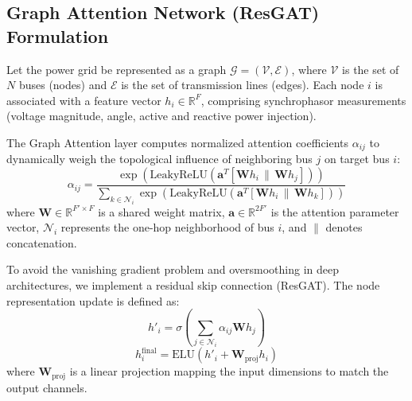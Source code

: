 \documentclass[conference]{IEEEtran}
\begin{document}
\subsection{Graph Attention Network (ResGAT) Formulation}
Let the power grid be represented as a graph $\mathcal{G} = (\mathcal{V}, \mathcal{E})$, where $\mathcal{V}$ is the set of $N$ buses (nodes) and $\mathcal{E}$ is the set of transmission lines (edges). Each node $i$ is associated with a feature vector $h_i \in \mathbb{R}^F$, comprising synchrophasor measurements (voltage magnitude, angle, active and reactive power injection).

The Graph Attention layer computes normalized attention coefficients $\alpha_{ij}$ to dynamically weigh the topological influence of neighboring bus $j$ on target bus $i$:
\begin{equation}
\alpha_{ij} = \frac{\exp\left(\text{LeakyReLU}\left(\mathbf{a}^T [\mathbf{W}h_i \,\|\, \mathbf{W}h_j]\right)\right)}{\sum_{k \in \mathcal{N}_i} \exp\left(\text{LeakyReLU}\left(\mathbf{a}^T [\mathbf{W}h_i \,\|\, \mathbf{W}h_k]\right)\right)}
\end{equation}
where $\mathbf{W} \in \mathbb{R}^{F' \times F}$ is a shared weight matrix, $\mathbf{a} \in \mathbb{R}^{2F'}$ is the attention parameter vector, $\mathcal{N}_i$ represents the one-hop neighborhood of bus $i$, and $\|$ denotes concatenation. 

To avoid the vanishing gradient problem and oversmoothing in deep architectures, we implement a residual skip connection (ResGAT). The node representation update is defined as:
\begin{equation}
h'_i = \sigma \left( \sum_{j \in \mathcal{N}_i} \alpha_{ij} \mathbf{W}h_j \right)
\end{equation}
\begin{equation}
h^{\text{final}}_i = \text{ELU}\left(h'_i + \mathbf{W}_{\text{proj}} h_i\right)
\end{equation}
where $\mathbf{W}_{\text{proj}}$ is a linear projection mapping the input dimensions to match the output channels.
\end{document}

